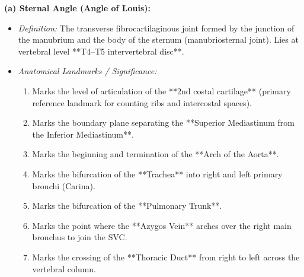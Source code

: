 \documentclass[11pt,a4paper]{article}
\begin{document}
\begin{ansbox}
\textbf{(a) Sternal Angle (Angle of Louis):}
\begin{itemize}[leftmargin=*]
    \item \textit{Definition:} The transverse fibrocartilaginous joint formed by the junction of the manubrium and the body of the sternum (manubriosternal joint). Lies at vertebral level **T4--T5 intervertebral disc**.
    \item \textit{Anatomical Landmarks / Significance:}
    \begin{enumerate}
        \item Marks the level of articulation of the **2nd costal cartilage** (primary reference landmark for counting ribs and intercostal spaces).
        \item Marks the boundary plane separating the **Superior Mediastinum from the Inferior Mediastinum**.
        \item Marks the beginning and termination of the **Arch of the Aorta**.
        \item Marks the bifurcation of the **Trachea** into right and left primary bronchi (Carina).
        \item Marks the bifurcation of the **Pulmonary Trunk**.
        \item Marks the point where the **Azygos Vein** arches over the right main bronchus to join the SVC.
        \item Marks the crossing of the **Thoracic Duct** from right to left across the vertebral column.
    \end{enumerate}
\end{itemize}


\end{ansbox}
\end{document}
